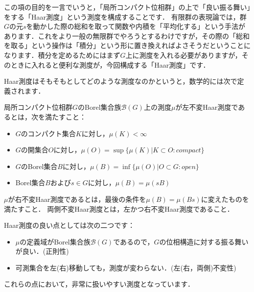 

この項の目的を一言でいうと，「局所コンパクト位相群」の上で「良い振る舞い」をする「Haar測度」という測度を構成することです．
有限群の表現論では，群$G$の元$s$を動かした際の総和を取って関数や内積を「平均化する」という手法があります．これをより一般の無限群でやろうとするわけですが，その際の「総和を取る」という操作は「積分」という形に置き換えればよさそうだということになります．積分を定めるためにはまず$G$上に測度を入れる必要がありますが，そのときに入れると便利な測度が，今回構成する「Haar測度」です．

Haar測度はそもそもとしてどのような測度なのかというと，数学的には次で定義されます．
\begin{ydefi}[Haar測度]\label{1}
局所コンパクト位相群$G$のBorel集合族$\mathscr{B}(G)$上の測度$\mu$が左不変Haar測度であるとは，次を満たすこと：
\begin{itemize}
 \item $G$のコンパクト集合$K$に対し，$\mu(K) < \infty$
 \item $G$の開集合$O$に対し，$\mu(O)=\sup \{ \mu(K) | K \subset O \colon compact \}$
 \item $G$のBorel集合$B$に対し，$\mu(B)=\inf \{ \mu(O) | O \subset G \colon open \}$
 \item Borel集合$B$および$s \in G$に対し，$\mu (B) = \mu (sB)$
\end{itemize}
$\mu$が右不変Haar測度であるとは，最後の条件を$\mu (B) = \mu (Bs)$に変えたものを満たすこと．
両側不変Haar測度とは，左かつ右不変Haar測度であること．
\end{ydefi}
Haar測度の良い点としては次の二つです：
\begin{itemize}
 \item $\mu$の定義域がBorel集合族$\mathscr{B}(G)$であるので，$G$の位相構造に対する振る舞いが良い．(正則性)
 \item 可測集合を左(右)移動しても，測度が変わらない．(左(右，両側)不変性)
\end{itemize}
これらの点において，非常に扱いやすい測度となっています．

